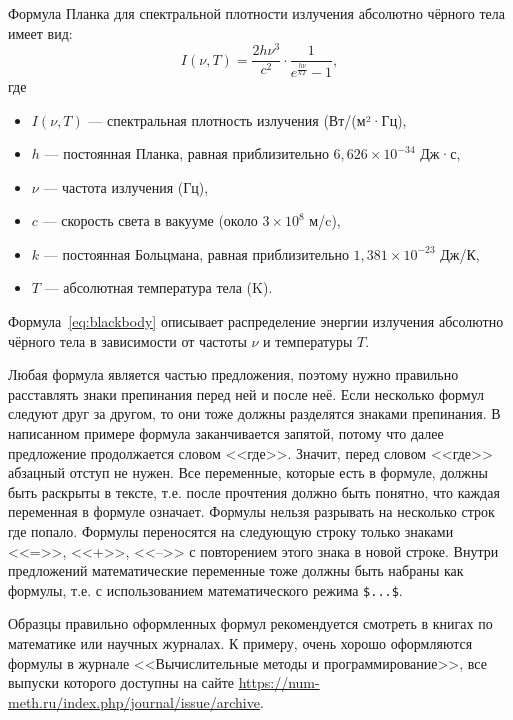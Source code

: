 \documentclass[14pt]{extarticle}
\begin{document}
\begin{tcolorbox}[title={Пример оформления формулы}]
\par Формула Планка для спектральной плотности излучения абсолютно чёрного тела имеет вид:
\begin{equation}
\label{eq:blackbody}
I(\nu, T) = \frac{2h\nu^3}{c^2} \cdot \frac{1}{e^{\frac{h\nu}{kT}} - 1},
\end{equation}
где
\begin{itemize}[label=$\bullet$]
	\item $I(\nu, T)$ --- спектральная плотность излучения (Вт/(м²·Гц),
	\item $h$ --- постоянная Планка, равная приблизительно $6,626 \times 10^{-34}$ Дж·с,
	\item $\nu$ --- частота излучения (Гц),
	\item $c$ --- скорость света в вакууме (около $3 \times 10^8$ м/c),
	\item $k$ --- постоянная Больцмана, равная приблизительно $1,381 \times 10^{-23}$ Дж/К,
	\item $T$ --- абсолютная температура тела (K).
\end{itemize}

\par Формула~\eqref{eq:blackbody} описывает распределение энергии излучения абсолютно чёрного тела в зависимости от частоты $\nu$ и температуры $T$.
\end{tcolorbox}

Любая формула является частью предложения, поэтому нужно правильно расставлять знаки препинания перед ней и после неё. Если несколько формул следуют друг за другом, то они тоже должны разделятся знаками препинания. В написанном примере формула заканчивается запятой, потому что далее предложение продолжается словом <<где>>. Значит, перед словом <<где>> абзацный отступ не нужен. Все переменные, которые есть в формуле, должны быть раскрыты в тексте, т.е. после прочтения должно быть понятно, что каждая переменная в формуле означает. Формулы нельзя разрывать на несколько строк где попало. Формулы переносятся на следующую строку только знаками <<=>>, <<+>>, <<-->> с повторением этого знака в новой строке. Внутри предложений математические переменные тоже должны быть набраны как формулы, т.е. с использованием математического режима \verb|$...$|.

Образцы правильно оформленных формул рекомендуется смотреть в книгах по математике или научных журналах. К примеру, очень хорошо оформляются формулы в журнале <<Вычислительные методы и программирование>>, все выпуски которого доступны на сайте \href{https://num-meth.ru/index.php/journal/issue/archive}{https://num-meth.ru/index.php/journal/issue/archive}.
\end{document}

